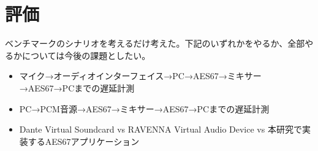 \chapter{評価}
\label{chap:evaluation}

ベンチマークのシナリオを考えるだけ考えた。下記のいずれかをやるか、全部やるかについては今後の課題としたい。

\begin{itemize}
  \item マイク→オーディオインターフェイス→PC→AES67→ミキサー→AES67→PCまでの遅延計測
  \item PC→PCM音源→AES67→ミキサー→AES67→PCまでの遅延計測
  \item Dante Virtual Soundcard vs RAVENNA Virtual Audio Device vs 本研究で実装するAES67アプリケーション
\end{itemize}
